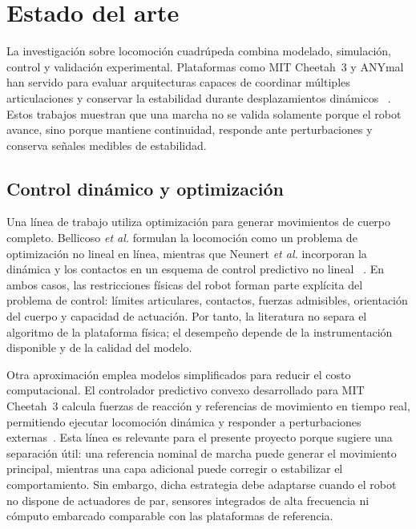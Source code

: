 \chapter{Estado del arte}

La investigación sobre locomoción cuadrúpeda combina modelado, simulación,
control y validación experimental. Plataformas como MIT Cheetah~3 y ANYmal han
servido para evaluar arquitecturas capaces de coordinar múltiples articulaciones
y conservar la estabilidad durante desplazamientos dinámicos
~\cite{bledt2018cheetah3,hutter2016anymal}. Estos trabajos muestran que una
marcha no se valida solamente porque el robot avance, sino porque mantiene
continuidad, responde ante perturbaciones y conserva señales medibles de
estabilidad.

\section{Control dinámico y optimización}

Una línea de trabajo utiliza optimización para generar movimientos de cuerpo
completo. Bellicoso \textit{et al.} formulan la locomoción como un problema de
optimización no lineal en línea, mientras que Neunert \textit{et al.} incorporan
la dinámica y los contactos en un esquema de control predictivo no lineal
~\cite{bellicoso2018dynamic,neunert2018wholebody}. En ambos casos, las
restricciones físicas del robot forman parte explícita del problema de control:
límites articulares, contactos, fuerzas admisibles, orientación del cuerpo y
capacidad de actuación. Por tanto, la literatura no separa el algoritmo de la
plataforma física; el desempeño depende de la instrumentación disponible y de la
calidad del modelo.

Otra aproximación emplea modelos simplificados para reducir el costo
computacional. El controlador predictivo convexo desarrollado para MIT
Cheetah~3 calcula fuerzas de reacción y referencias de movimiento en tiempo
real, permitiendo ejecutar locomoción dinámica y responder a perturbaciones
externas~\cite{dicarlo2018mpc}. Esta línea es relevante para el presente
proyecto porque sugiere una separación útil: una referencia nominal de marcha
puede generar el movimiento principal, mientras una capa adicional puede
corregir o estabilizar el comportamiento. Sin embargo, dicha estrategia debe
adaptarse cuando el robot no dispone de actuadores de par, sensores integrados
de alta frecuencia ni cómputo embarcado comparable con las plataformas de
referencia.

